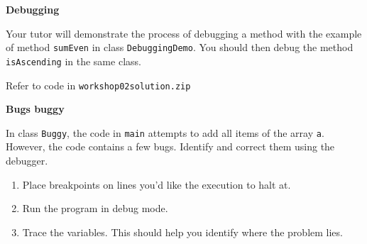 \vspace{1em}
\begin{questions}

%
%
%
%
%

\question \textbf{Debugging}

Your tutor will demonstrate the process of debugging a method with the example of method \texttt{sumEven} in class \texttt{DebuggingDemo}. You should then debug the method \texttt{isAscending} in the same class.

\begin{solution}
Refer to code in \texttt{workshop02solution.zip}	
\end{solution}

\vskip 0.5cm

\question \textbf{Bugs buggy}

In class \texttt{Buggy}, the code in \texttt{main} attempts to add all items of the array \texttt{a}. However, the code contains a few bugs. Identify and correct them using the debugger. 

\begin{enumerate}
\item Place breakpoints on lines you'd like the execution to halt at.	
\item Run the program in debug mode.
\item Trace the variables. This should help you identify where the problem lies.
\end{enumerate}


\end{questions}

